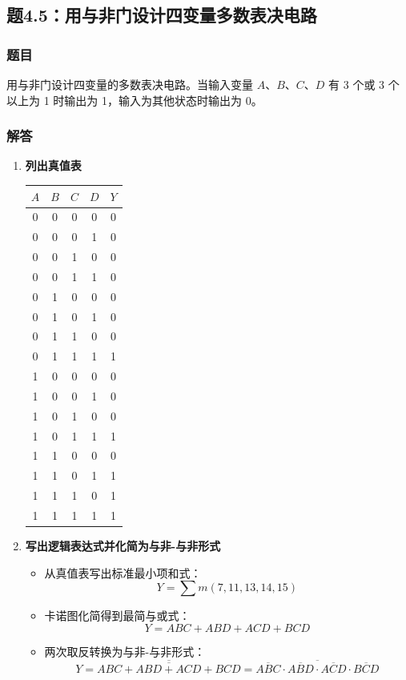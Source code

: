 \subsection{题4.5：用与非门设计四变量多数表决电路}
\subsubsection{题目}
用与非门设计四变量的多数表决电路。当输入变量 $A$、$B$、$C$、$D$ 有 3 个或 3 个以上为 1 时输出为 1，输入为其他状态时输出为 0。

\subsubsection{解答}
\begin{enumerate}
    \item \textbf{列出真值表}
    \begin{center}
    \begin{tabular}{cccc|c}
        \toprule
        $A$ & $B$ & $C$ & $D$ & $Y$ \\
        \midrule
        0 & 0 & 0 & 0 & 0 \\
        0 & 0 & 0 & 1 & 0 \\
        0 & 0 & 1 & 0 & 0 \\
        0 & 0 & 1 & 1 & 0 \\
        0 & 1 & 0 & 0 & 0 \\
        0 & 1 & 0 & 1 & 0 \\
        0 & 1 & 1 & 0 & 0 \\
        0 & 1 & 1 & 1 & 1 \\
        1 & 0 & 0 & 0 & 0 \\
        1 & 0 & 0 & 1 & 0 \\
        1 & 0 & 1 & 0 & 0 \\
        1 & 0 & 1 & 1 & 1 \\
        1 & 1 & 0 & 0 & 0 \\
        1 & 1 & 0 & 1 & 1 \\
        1 & 1 & 1 & 0 & 1 \\
        1 & 1 & 1 & 1 & 1 \\
        \bottomrule
    \end{tabular}
    \end{center}

    \item \textbf{写出逻辑表达式并化简为与非-与非形式}
    \begin{itemize}
        \item 从真值表写出标准最小项和式：
        \[
        Y = \sum m(7,11,13,14,15)
        \]
        \item 卡诺图化简得到最简与或式：
        \[
        Y = ABC + ABD + ACD + BCD
        \]
        \item 两次取反转换为与非-与非形式：
        \[
        Y = \overline{\overline{ABC + ABD + ACD + BCD}}
        = \overline{\overline{ABC} \cdot \overline{ABD} \cdot \overline{ACD} \cdot \overline{BCD}}
        \]
    \end{itemize}


\end{enumerate}
